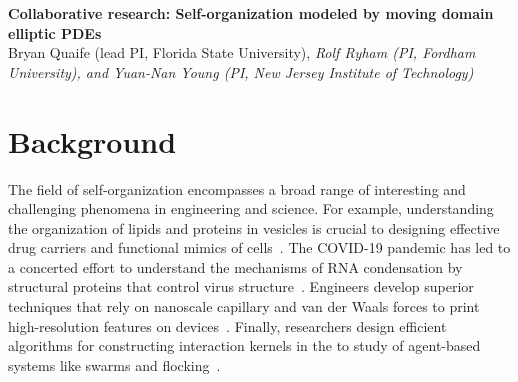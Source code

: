 \noindent
{\bf Collaborative research: Self-organization modeled by moving domain
elliptic PDEs} \\
{Bryan Quaife (lead PI, Florida State University), \em Rolf Ryham (PI,
Fordham University), and Yuan-Nan Young (PI, New Jersey Institute of
Technology)}

\section{Background}
\label{sec:background}

The field of self-organization encompasses a broad range of interesting
and challenging phenomena in engineering and science. For example,
understanding the organization of lipids and proteins in vesicles is
crucial to designing effective drug carriers and functional mimics of
cells~\cite{Marui2022IncreasedEO,
https://doi.org/10.1002/adma.202206288}. The COVID-19 pandemic has led
to a concerted effort to understand the mechanisms of RNA condensation
by structural proteins that control virus
structure~\cite{Kim2021SelfassembledMV}. Engineers develop superior
techniques that rely on nanoscale capillary and van der Waals forces to
print high-resolution features on devices~\cite{Zeng20223DprintedMT}.
Finally, researchers design efficient algorithms for constructing
interaction kernels in the to study of agent-based systems like swarms
and flocking~\cite{Lu2019NonparametricIO, Tadmor2021OnTM}.


